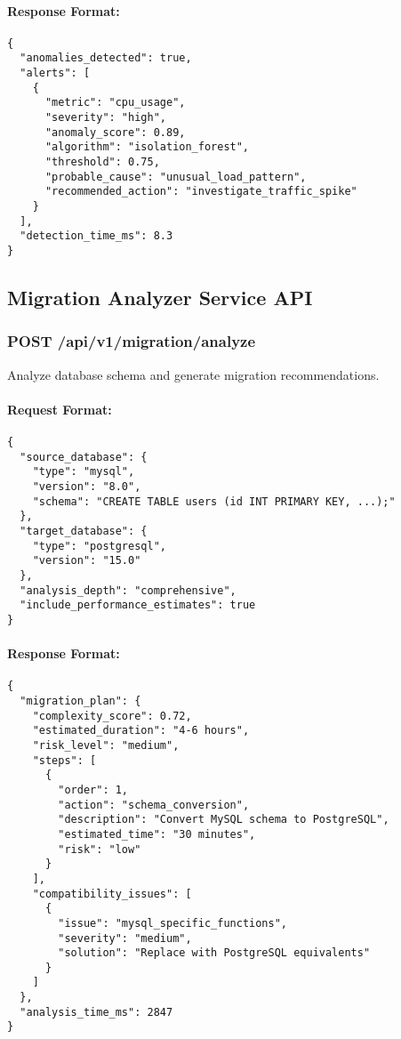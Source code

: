 \paragraph{Response Format:}
\begin{verbatim}
{
  "anomalies_detected": true,
  "alerts": [
    {
      "metric": "cpu_usage",
      "severity": "high",
      "anomaly_score": 0.89,
      "algorithm": "isolation_forest",
      "threshold": 0.75,
      "probable_cause": "unusual_load_pattern",
      "recommended_action": "investigate_traffic_spike"
    }
  ],
  "detection_time_ms": 8.3
}
\end{verbatim}

\subsection{Migration Analyzer Service API}

\subsubsection{POST /api/v1/migration/analyze}

Analyze database schema and generate migration recommendations.

\paragraph{Request Format:}
\begin{verbatim}
{
  "source_database": {
    "type": "mysql",
    "version": "8.0",
    "schema": "CREATE TABLE users (id INT PRIMARY KEY, ...);"
  },
  "target_database": {
    "type": "postgresql",
    "version": "15.0"
  },
  "analysis_depth": "comprehensive",
  "include_performance_estimates": true
}
\end{verbatim}

\paragraph{Response Format:}
\begin{verbatim}
{
  "migration_plan": {
    "complexity_score": 0.72,
    "estimated_duration": "4-6 hours",
    "risk_level": "medium",
    "steps": [
      {
        "order": 1,
        "action": "schema_conversion",
        "description": "Convert MySQL schema to PostgreSQL",
        "estimated_time": "30 minutes",
        "risk": "low"
      }
    ],
    "compatibility_issues": [
      {
        "issue": "mysql_specific_functions",
        "severity": "medium",
        "solution": "Replace with PostgreSQL equivalents"
      }
    ]
  },
  "analysis_time_ms": 2847
}
\end{verbatim}

